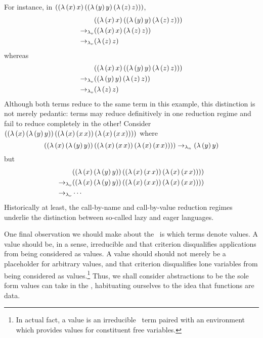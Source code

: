 For instance, in $((\lambda\,(x)\,x)\,((\lambda\,(y)\,y)\,(\lambda\,(z)\,z)))$,
\begin{align*}
      &((\lambda\,(x)\,x)\,((\lambda\,(y)\,y)\,(\lambda\,(z)\,z)))\\
\rightarrow_{\lambda_v} &((\lambda\,(x)\,x)\,(\lambda\,(z)\,z))\\
\rightarrow_{\lambda_v} &(\lambda\,(z)\,z)
\end{align*}
whereas
\begin{align*}
      &((\lambda\,(x)\,x)\,((\lambda\,(y)\,y)\,(\lambda\,(z)\,z)))\\
\rightarrow_{\lambda_v} &((\lambda\,(y)\,y)\,(\lambda\,(z)\,z))\\
\rightarrow_{\lambda_v} &(\lambda\,(z)\,z)
\end{align*}
Although both terms reduce to the same term in this example, this distinction is not
merely pedantic: terms may reduce definitively in one reduction regime and fail to reduce
completely in the other! Consider
$((\lambda\,(x)\,(\lambda\,(y)\,y))\,((\lambda\,(x)\,(x\,x))\,(\lambda\,(x)\,(x\,x))))$ where
\[
((\lambda\,(x)\,(\lambda\,(y)\,y))\,((\lambda\,(x)\,(x\,x))\,(\lambda\,(x)\,(x\,x))))\rightarrow_{\lambda_n}(\lambda\,(y)\,y)
\]
but
\begin{align*}
      &((\lambda\,(x)\,(\lambda\,(y)\,y))\,((\lambda\,(x)\,(x\,x))\,(\lambda\,(x)\,(x\,x))))\\
\rightarrow_{\lambda_v} &((\lambda\,(x)\,(\lambda\,(y)\,y))\,((\lambda\,(x)\,(x\,x))\,(\lambda\,(x)\,(x\,x))))\\
\rightarrow_{\lambda_v} &\cdots
\end{align*}
Historically at least, the call-by-name and call-by-value reduction regimes underlie the
distinction between so-called lazy and eager languages.

One final observation we should make about the \lc\ is which terms denote values. A value
should be, in a sense, irreducible and that criterion disqualifies applications from being
considered as values. A value should should not merely be a placeholder for arbitrary
values, and that criterion disqualifies lone variables from being considered as
values.\footnote{In actual fact, a value is an irreducible \lc\ term paired with an
environment which provides values for constituent free variables.} Thus, we shall consider
abstractions to be the sole form values can take in the \lc, habituating ourselves to the
idea that functions are data.

